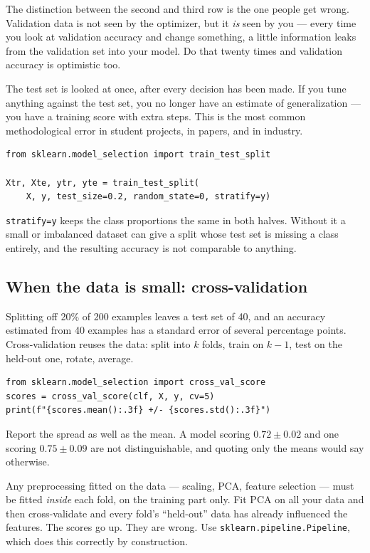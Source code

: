 \documentclass[11pt]{article}
\begin{document}
The distinction between the second and third row is the one people get wrong.
Validation data is not seen by the optimizer, but it \emph{is} seen by you ---
every time you look at validation accuracy and change something, a little
information leaks from the validation set into your model. Do that twenty times
and validation accuracy is optimistic too.

\begin{keybox}
 The test set is looked at once, after every decision has
been made. If you tune anything against the test set, you no longer have an
estimate of generalization --- you have a training score with extra steps. This
is the most common methodological error in student projects, in papers, and in
industry.
\end{keybox}

\begin{lstlisting}
from sklearn.model_selection import train_test_split

Xtr, Xte, ytr, yte = train_test_split(
    X, y, test_size=0.2, random_state=0, stratify=y)
\end{lstlisting}

\texttt{stratify=y} keeps the class proportions the same in both halves. Without
it a small or imbalanced dataset can give a split whose test set is missing a
class entirely, and the resulting accuracy is not comparable to anything.

\subsection{When the data is small: cross-validation}

Splitting off 20\% of 200 examples leaves a test set of 40, and an accuracy
estimated from 40 examples has a standard error of several percentage points.
Cross-validation reuses the data: split into $k$ folds, train on $k-1$, test on
the held-out one, rotate, average.

\begin{lstlisting}
from sklearn.model_selection import cross_val_score
scores = cross_val_score(clf, X, y, cv=5)
print(f"{scores.mean():.3f} +/- {scores.std():.3f}")
\end{lstlisting}

Report the spread as well as the mean. A model scoring $0.72 \pm 0.02$ and one
scoring $0.75 \pm 0.09$ are not distinguishable, and quoting only the means
would say otherwise.

\begin{keybox}
 Any preprocessing fitted on the data --- scaling,
PCA, feature selection --- must be fitted \emph{inside} each fold, on the training
part only. Fit PCA on all your data and then cross-validate and every fold's
``held-out'' data has already influenced the features. The scores go up. They are
wrong. Use \texttt{sklearn.pipeline.Pipeline}, which does this correctly by
construction.
\end{keybox}
\end{document}
